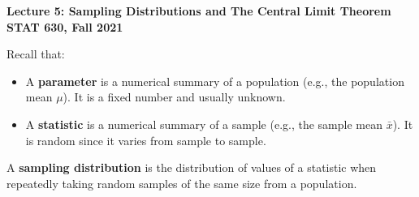 \documentclass[fleqn]{article}\usepackage[]{graphicx}\usepackage[]{color}
\begin{document}
\setlength\parindent{0pt}

\begin{center}
\large
\textbf{Lecture 5: Sampling Distributions and The Central Limit Theorem}\\
\normalsize
\textbf{STAT 630, Fall 2021}\\
\hrulefill
\end{center}

Recall that:
\begin{itemize}
\item A \textbf{parameter} is a numerical summary of a population (e.g., the population mean $\mu$).  It is a fixed number and usually unknown.
\item A \textbf{statistic} is a numerical summary of a sample (e.g., the sample mean $\bar{x}$).  It is random since it varies from sample to sample.\\
\end{itemize}

A \textbf{sampling distribution} is the distribution of values of a statistic when repeatedly taking random samples of the same size from a population.\\  
\end{document}
